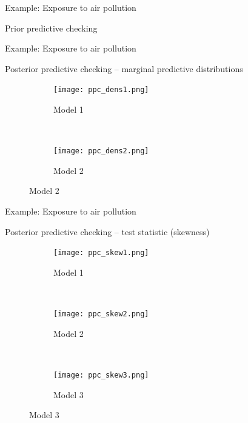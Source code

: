 \documentclass[t]{beamer}
\begin{document}
\begin{frame}{Example: Exposure to air pollution}

  Prior predictive checking
  \vspace{-1\baselineskip}
  \begin{center}
\end{center}
\end{frame}

\begin{frame}{Example: Exposure to air pollution}

  Posterior predictive checking -- marginal predictive distributions
\begin{figure}
\centering
\begin{subfigure}{0.48\textwidth}
\texttt{[image: ppc\_dens1.png]}
\caption{Model 1}
\end{subfigure}
~
\begin{subfigure}{0.48\textwidth}
\texttt{[image: ppc\_dens2.png]}
\caption{Model 2}
\end{subfigure}
\end{figure}

\end{frame}

\begin{frame}{Example: Exposure to air pollution}


  Posterior predictive checking -- test statistic (skewness)
\begin{figure}
\centering
\begin{subfigure}{0.31\textwidth}
\texttt{[image: ppc\_skew1.png]}
\caption{Model 1}
\end{subfigure}
~
\begin{subfigure}{0.31\textwidth}
\texttt{[image: ppc\_skew2.png]}
\caption{Model 2}
\end{subfigure}
~
\begin{subfigure}{0.31\textwidth}
\texttt{[image: ppc\_skew3.png]}
\caption{Model 3}
\end{subfigure}

\end{figure}

\end{frame}
\end{document}
